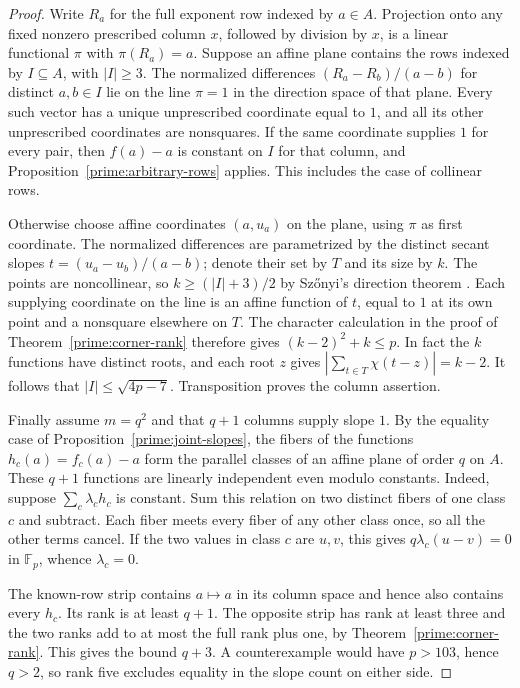 \documentclass[11pt,a4paper]{article}
\numberwithin{equation}{section}
\begin{document}
\begin{proof}
Write $R_a$ for the full exponent row indexed by $a\in A$. Projection onto any fixed nonzero prescribed column $x$, followed by division by $x$, is a linear functional $\pi$ with $\pi(R_a)=a$. Suppose an affine plane contains the rows indexed by $I\subseteq A$, with $|I|\ge3$. The normalized differences $(R_a-R_b)/(a-b)$ for distinct $a,b\in I$ lie on the line $\pi=1$ in the direction space of that plane. Every such vector has a unique unprescribed coordinate equal to $1$, and all its other unprescribed coordinates are nonsquares. If the same coordinate supplies $1$ for every pair, then $f(a)-a$ is constant on $I$ for that column, and Proposition~\ref{prime:arbitrary-rows} applies. This includes the case of collinear rows.

Otherwise choose affine coordinates $(a,u_a)$ on the plane, using $\pi$ as first coordinate. The normalized differences are parametrized by the distinct secant slopes $t=(u_a-u_b)/(a-b)$; denote their set by $T$ and its size by $k$. The points are noncollinear, so $k\ge(|I|+3)/2$ by Sz\H{o}nyi's direction theorem \cite[Theorem~5.2]{szonyi}. Each supplying coordinate on the line is an affine function of $t$, equal to $1$ at its own point and a nonsquare elsewhere on $T$. The character calculation in the proof of Theorem~\ref{prime:corner-rank} therefore gives $(k-2)^2+k\le p$. In fact the $k$ functions have distinct roots, and each root $z$ gives $|\sum_{t\in T}\chi(t-z)|=k-2$. It follows that $|I|\le\sqrt{4p-7}$. Transposition proves the column assertion.

Finally assume $m=q^2$ and that $q+1$ columns supply slope $1$. By the equality case of Proposition~\ref{prime:joint-slopes}, the fibers of the functions $h_c(a)=f_c(a)-a$ form the parallel classes of an affine plane of order $q$ on $A$. These $q+1$ functions are linearly independent even modulo constants. Indeed, suppose $\sum_c\lambda_c h_c$ is constant. Sum this relation on two distinct fibers of one class $c$ and subtract. Each fiber meets every fiber of any other class once, so all the other terms cancel. If the two values in class $c$ are $u,v$, this gives $q\lambda_c(u-v)=0$ in $\mathbb F_p$, whence $\lambda_c=0$.

The known-row strip contains $a\mapsto a$ in its column space and hence also contains every $h_c$. Its rank is at least $q+1$. The opposite strip has rank at least three and the two ranks add to at most the full rank plus one, by Theorem~\ref{prime:corner-rank}. This gives the bound $q+3$. A counterexample would have $p>103$, hence $q>2$, so rank five excludes equality in the slope count on either side.
\end{proof}
\end{document}
